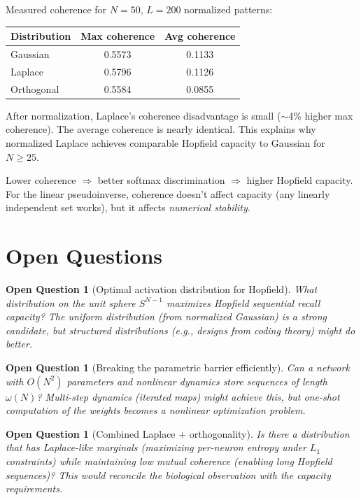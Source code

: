 \documentclass[11pt]{article}
\newtheorem{question}[theorem]{Open Question}
\theoremstyle{definition}
\theoremstyle{remark}
\begin{document}
Measured coherence for $N = 50$, $L = 200$ normalized patterns:

\begin{center}
\begin{tabular}{l c c}
\toprule
Distribution & Max coherence & Avg coherence \\
\midrule
Gaussian & 0.5573 & 0.1133 \\
Laplace  & 0.5796 & 0.1126 \\
Orthogonal & 0.5584 & 0.0855 \\
\bottomrule
\end{tabular}
\end{center}

After normalization, Laplace's coherence disadvantage is small ($\sim$4\% higher max coherence). The average coherence is nearly identical. This explains why normalized Laplace achieves comparable Hopfield capacity to Gaussian for $N \geq 25$.

Lower coherence $\Rightarrow$ better softmax discrimination $\Rightarrow$ higher Hopfield capacity. For the linear pseudoinverse, coherence doesn't affect capacity (any linearly independent set works), but it affects \emph{numerical stability}.

\section{Open Questions}

\begin{question}[Optimal activation distribution for Hopfield]
What distribution on the unit sphere $S^{N-1}$ maximizes Hopfield sequential recall capacity? The uniform distribution (from normalized Gaussian) is a strong candidate, but structured distributions (e.g., designs from coding theory) might do better.
\end{question}

\begin{question}[Breaking the parametric barrier efficiently]
Can a network with $O(N^2)$ parameters and nonlinear dynamics store sequences of length $\omega(N)$? Multi-step dynamics (iterated maps) might achieve this, but one-shot computation of the weights becomes a nonlinear optimization problem.
\end{question}

\begin{question}[Combined Laplace + orthogonality]
Is there a distribution that has Laplace-like marginals (maximizing per-neuron entropy under $L_1$ constraints) while maintaining low mutual coherence (enabling long Hopfield sequences)? This would reconcile the biological observation with the capacity requirements.
\end{question}
\end{document}
